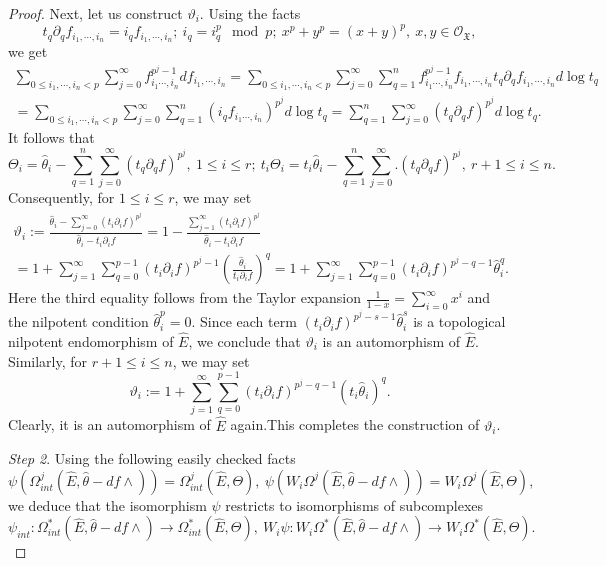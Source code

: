 \documentclass[12pt, a4paper]{article}
\begin{document}
\begin{proof}
Next, let us construct $\vartheta_i$. Using the facts
$$
t_q\partial_qf_{i_1,\cdots,i_n}=i_qf_{i_1,\cdots,i_n};~i_q=i_q^p\mod p;~x^p+y^p=(x+y)^p,~x,y\in\mathcal O_{\mathfrak X},
$$
we get
\begin{eqnarray*}
\sum_{0\leq i_1,\cdots,i_n<p}\sum_{j=0}^{\infty}f_{i_1\cdots,i_n}^{p^j-1}df_{i_1,\cdots,i_n}=\sum_{0\leq i_1,\cdots,i_n<p}\sum_{j=0}^{\infty}\sum_{q=1}^nf_{i_1\cdots,i_n}^{p^j-1}f_{i_1,\cdots,i_n}t_q\partial_qf_{i_1,\cdots,i_n}d\log t_q\\
=\sum_{0\leq i_1,\cdots,i_n<p}\sum_{j=0}^{\infty}\sum_{q=1}^n(i_qf_{i_1\cdots,i_n})^{p^j}d\log t_q=\sum_{q=1}^n\sum_{j=0}^{\infty}(t_q\partial_qf)^{p^j}d\log t_q.~~~~~~~~~~
\end{eqnarray*}
It follows that
$$
\Theta_i=\hat\theta_i-\sum_{q=1}^n\sum_{j=0}^{\infty}(t_q\partial_qf)^{p^j},~1\leq i\leq r;~t_i\Theta_i=t_i\hat\theta_i-\sum_{q=1}^n\sum_{j=0}^{\infty}.(t_q\partial_qf)^{p^j},~r+1\leq i\leq n.
$$
Consequently, for $1\leq i\leq r$, we may set
\begin{eqnarray*}
\vartheta_i:=\frac{\hat\theta_i-\sum_{j=0}^\infty(t_i\partial_i f)^{p^j}}{\hat\theta_i-t_i\partial_i f}=1-\frac{\sum_{j=1}^\infty(t_i\partial_i f)^{p^j}}{\hat\theta_i-t_i\partial_i f}~~~~~~\\
=1+\sum_{j=1}^\infty\sum_{q=0}^{p-1}(t_i\partial_i f)^{p^j-1}(\frac{\hat\theta_i}{t_i\partial_if})^q=1+\sum_{j=1}^\infty\sum_{q=0}^{p-1}(t_i\partial_i f)^{p^j-q-1}\hat\theta_i^q.
\end{eqnarray*}
Here the third equality follows from the Taylor expansion
$\frac{1}{1-x}=\sum_{i=0}^\infty x^i$
and the nilpotent condition $\hat\theta_i^p=0$. Since each term $(t_i\partial_i f)^{p^j-s-1}\hat\theta_i^s$ is a topological nilpotent endomorphism of $\hat E$, we conclude that $\vartheta_i$ is an automorphism of $\hat E$. Similarly, for $r+1\leq i\leq n$, we may set
$$
\vartheta_i:=1+\sum_{j=1}^\infty\sum_{q=0}^{p-1}(t_i\partial_i f)^{p^j-q-1}(t_i\hat\theta_i)^q.
$$
Clearly, it is an automorphism of $\hat E$ again.This completes the construction of $\vartheta_i$.

\emph{Step 2}. Using the following easily checked facts
$$
\psi(\Omega_{int}^j(\hat E,\hat\theta-df\wedge))=\Omega_{int}^j(\hat E,\Theta),~\psi(W_i\Omega^j(\hat E,\hat\theta-df\wedge))=W_i\Omega^j(\hat E,\Theta),
$$
we deduce that the isomorphism $\psi$ restricts to isomorphisms of subcomplexes
$$
\psi_{int}:\Omega_{int}^*(\hat E,\hat\theta-df\wedge)\to\Omega_{int}^*(\hat E,\Theta),~W_i\psi:W_i\Omega^*(\hat E,\hat\theta-df\wedge)\to W_i\Omega^*(\hat E,\Theta).
$$ 


\end{proof}
\end{document}
